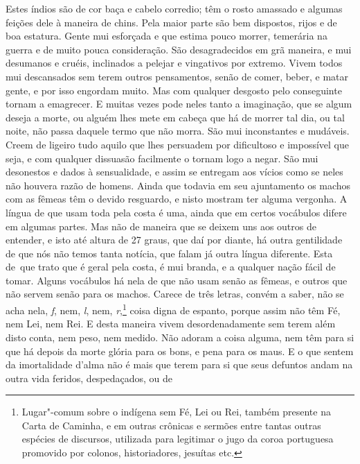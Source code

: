Estes índios são de cor baça 								%
e cabelo corredio; têm o rosto amassado e
algumas feições dele à maneira de chins. Pela maior parte são bem %
dispostos, rijos e de boa estatura. Gente mui esforçada e que estima
pouco morrer, temerária na guerra e de muito pouca consideração. São
desagradecidos em grã maneira, e mui desumanos e cruéis, inclinados a
pelejar e vingativos por extremo. Vivem todos mui descansados sem terem
outros pensamentos, senão de comer, beber, e matar gente, e por isso
engordam muito. Mas com qualquer desgosto pelo conseguinte tornam a
emagrecer.
E muitas vezes pode neles tanto a imaginação, que se algum
deseja a morte, ou alguém lhes mete em cabeça que há de morrer tal dia,
ou tal noite, não passa daquele termo que não morra. São mui
inconstantes e mudáveis. Creem de ligeiro tudo aquilo que lhes persuadem
por dificultoso e impossível que seja, e com qualquer dissuasão
facilmente o tornam logo a negar. São mui desonestos e dados à
sensualidade, e assim se entregam aos vícios como se neles não houvera
razão de homens. Ainda que todavia em seu ajuntamento os machos com as
fêmeas têm o devido resguardo, e nisto mostram ter alguma vergonha.
A língua de que usam toda pela costa é uma, ainda que em certos			%
vocábulos difere em algumas partes. Mas não de maneira que se deixem uns
aos outros de entender, e isto até altura de 27 graus, que
daí por diante, há outra gentilidade de que nós não temos tanta
notícia, que falam já outra língua diferente. Esta \mbox{de que} trato que é
geral pela costa, é mui branda, e a qualquer nação fácil de tomar.
Alguns vocábulos há nela de que não usam senão as fêmeas, e outros que não servem
senão para os machos. Carece de três letras, convém a saber, não se
acha nela, \textit{f}, nem, \textit{l}, nem, \textit{r},\footnote{ Lugar"-comum sobre o indígena sem Fé, Lei
ou Rei, também presente na Carta de Caminha, e em outras crônicas e sermões entre
tantas outras espécies de discursos, utilizada para legitimar o jugo da coroa
portuguesa promovido por colonos, historiadores, jesuítas etc.} coisa digna de
espanto, porque assim não têm  \label{feleirei}%
Fé, nem Lei, nem Rei. E desta maneira vivem desordenadamente sem terem		%
além disto conta, nem peso, nem medido. Não adoram a coisa alguma, nem
têm para si que há depois da morte glória para os bons, e pena para os		%
maus. E o que sentem da imortalidade d'alma não é mais que terem para
si que seus defuntos andam na outra vida feridos, despedaçados, ou de
